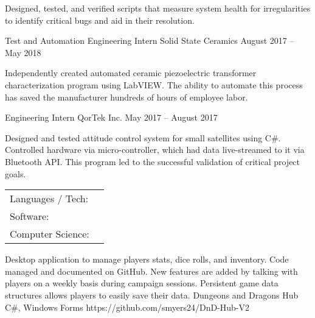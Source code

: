 \documentclass[]{awesome-cv}
\begin{document}
\begin{cventries}
{\begin{cvitems}
		\item {Designed, tested, and verified scripts that measure system health for irregularities to identify critical bugs and aid in their resolution.}
		\end{cvitems}}
	\cventry
	{Test and Automation Engineering Intern}
	{Solid State Ceramics}
	{}
	{August 2017 – May 2018}
	{\begin{cvitems}
		\item {Independently created automated ceramic piezoelectric transformer characterization program using LabVIEW. The ability to automate this process has saved the manufacturer hundreds of hours of employee labor.}
		\end{cvitems}}
	\cventry
	{Engineering Intern}
	{QorTek Inc.}
	{}
	{May 2017 – August 2017}
	{\begin{cvitems}
		\item {Designed and tested attitude control system for small satellites using C\#. Controlled hardware via micro-controller, which had data live-streamed to it via Bluetooth API. This program led to the successful validation of critical project goals.}
		\end{cvitems}}
\end{cventries}

\vspace{-5mm}

\begin{cventries}
	\cventry
	{}
	{\def\arraystretch{1.15}{\begin{tabular}{ l l }
		Languages / Tech:  & {\skill{ C\#, JavaScript, HTML, ASP.NET, SQL}} \\
		Software:  & {\skill{ Visual Studio, SSMS, IIS, RabbitMQ, Jenkins, Datadog}} \\
		Computer Science:  & {\skill{ Rest API, OOP Principles, Data Structures, Algorithms}} \\
		\end{tabular}}}
	{}
	{}
	{}
\end{cventries}

\vspace{-10mm}
\begin{cventries}
	\cventry
	{Desktop application to manage players stats, dice rolls, and inventory. Code managed and documented on GitHub. New features are added by talking with players on a weekly basis during campaign sessions. Persistent game data structures allows players to easily save their data.}
	{Dungeons and Dragons Hub}
	{C\#, Windows Forms}
	{https://github.com/smyers24/DnD-Hub-V2}
	{}

\end{cventries}
\end{document}

